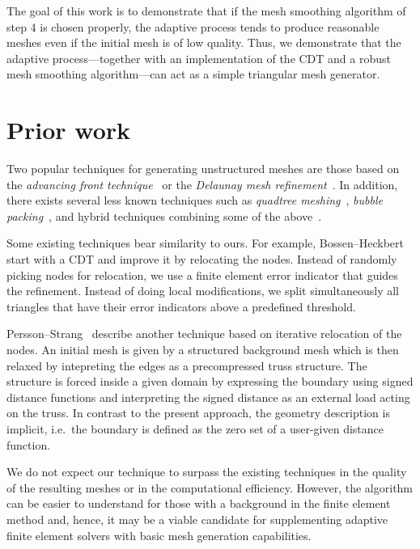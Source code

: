 \documentclass[12pt]{rmstyle}
\begin{document}
The goal of this work is to demonstrate that if the mesh smoothing algorithm of
step 4 is chosen properly, the adaptive process tends to produce reasonable
meshes even if the initial mesh is of low quality.  Thus, we demonstrate that
the adaptive process---together with an implementation of the CDT and a robust
mesh smoothing algorithm---can act as a simple triangular mesh generator.

\section{Prior work}
\label{sec:org7798f6d}

Two popular techniques for generating unstructured meshes are those based on the
\emph{advancing front technique}~\cite{L_hner_1988} or the \emph{Delaunay mesh
refinement}~\cite{Chew_1989, Ruppert_1995, Shewchuk_2002}.  In addition, there
exists several less known techniques such as \emph{quadtree
meshing}~\cite{Yerry_1983}, \emph{bubble packing}~\cite{Shimada_1995}, and
hybrid techniques combining some of the above~\cite{mavriplis1995advancing}.

Some existing techniques bear similarity to ours.  For example,
Bossen--Heckbert~\cite{bossen1996pliant} start with a CDT and improve it by
relocating the nodes.  Instead of randomly picking nodes for relocation, we use
a finite element error indicator that guides the refinement.  Instead of doing
local modifications, we split simultaneously all triangles that have their error
indicators above a predefined threshold.

Persson--Strang~\cite{persson2004simple} describe another technique based on
iterative relocation of the nodes.  An initial mesh is given by a structured
background mesh which is then relaxed by intepreting the edges as a
precompressed truss structure.  The structure is forced inside a given domain by
expressing the boundary using signed distance functions and interpreting the
signed distance as an external load acting on the truss.  In contrast to the
present approach, the geometry description is implicit, i.e.~the boundary is
defined as the zero set of a user-given distance function.

We do not expect our technique to surpass the existing techniques in the quality
of the resulting meshes or in the computational efficiency.  However, the
algorithm can be easier to understand for those with a background in the finite
element method and, hence, it may be a viable candidate for supplementing
adaptive finite element solvers with basic mesh generation capabilities.
\end{document}
